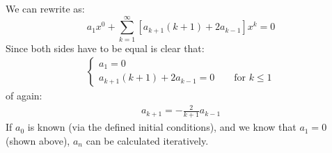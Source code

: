 \begin{exmp}{}
\begin{enumerate}
We can rewrite as:
\begin{equation*}
a_1x^0+ \sum^\infty_{k=1}\left[ a_{k+1} (k+1)+ 2 a_{k-1}\right]x^{k}=0
\end{equation*}
Since both sides have to be equal is  clear that:
\begin{align*}
 \begin{cases}
a_1=0\\
a_{k+1}(k+1)+2a_{k-1}=0 \qquad \text{for } k\leq 1
\end{cases}
\end{align*}
of again:
\begin{align*}
a_{k+1}=-\frac{2}{k+1}a_{k-1}
\end{align*}
If $a_0$ is known (via the defined initial conditions), and we know that $a_1=0$ (shown above), $a_n$ can be calculated iteratively.


\end{enumerate}
\end{exmp}
